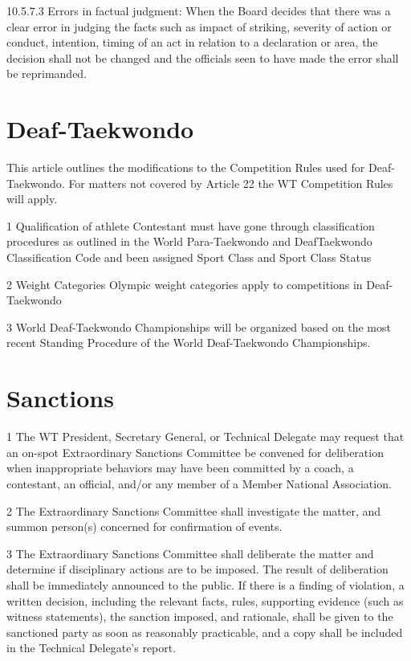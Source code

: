 \documentclass[draft]{report}
\begin{document}
10.5.7.3 Errors in factual judgment: When the Board decides that there
was a clear error in judging the facts such as impact of striking,
severity of action or conduct, intention, timing of an act in relation
to a declaration or area, the decision shall not be changed and the
officials seen to have made the error shall be reprimanded.


\chapter{Deaf-Taekwondo}\label{deaf-taekwondo}


This article outlines the modifications to the Competition Rules used
for Deaf-Taekwondo. For matters not covered by Article 22 the WT
Competition Rules will apply.

1 Qualification of athlete Contestant must have gone through
classification procedures as outlined in the World Para-Taekwondo and
DeafTaekwondo Classification Code and been assigned Sport Class and
Sport Class Status

2 Weight Categories Olympic weight categories apply to competitions in
Deaf-Taekwondo

3 World Deaf-Taekwondo Championships will be organized based on the most
recent Standing Procedure of the World Deaf-Taekwondo Championships.


\chapter{Sanctions}\label{sanctions}

1 The WT President, Secretary General, or Technical Delegate may request
that an on-spot Extraordinary Sanctions Committee be convened for
deliberation when inappropriate behaviors may have been committed by a
coach, a contestant, an official, and/or any member of a Member National
Association.

2 The Extraordinary Sanctions Committee shall investigate the matter,
and summon person(s) concerned for confirmation of events.

3 The Extraordinary Sanctions Committee shall deliberate the matter and
determine if disciplinary actions are to be imposed. The result of
deliberation shall be immediately announced to the public. If there is a
finding of violation, a written decision, including the relevant facts,
rules, supporting evidence (such as witness statements), the sanction
imposed, and rationale, shall be given to the sanctioned party as soon
as reasonably practicable, and a copy shall be included in the Technical
Delegate's report.
\end{document}
